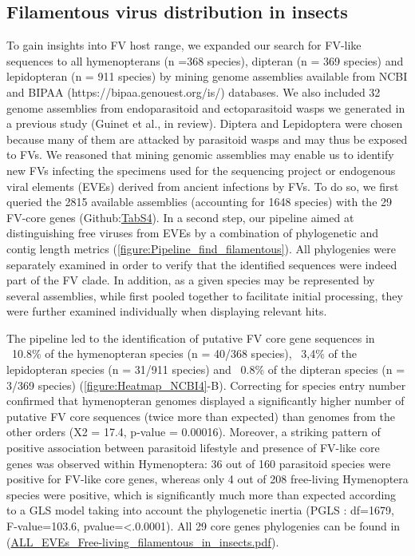\subsection{Filamentous virus distribution in insects}

To gain insights into FV host range, we expanded our search for FV-like sequences to all hymenopterans (n =368 species), dipteran (n = 369 species) and lepidopteran (n = 911 species) by mining genome assemblies available from NCBI and BIPAA (https://bipaa.genouest.org/is/) databases. We also included 32 genome assemblies from endoparasitoid and ectoparasitoid wasps we generated in a previous study (Guinet et al., in review). Diptera and Lepidoptera were chosen because many of them are attacked by parasitoid wasps and may thus be exposed to FVs. We reasoned that mining genomic assemblies may enable us to identify new FVs infecting the specimens used for the sequencing project or endogenous viral elements (EVEs) derived from ancient infections by FVs. To do so, we first queried the 2815 available assemblies (accounting for 1648 species) with the 29 FV-core genes (Github:\href{https://github.com/BenjaminGuinet/PhD_defense/blob/main/Supplementary_paper2/Table%20S4.xlsx}{TabS4}). In a second step, our pipeline aimed at distinguishing free viruses from EVEs by a combination of phylogenetic and contig length metrics (\figurename{\ref{figure:Pipeline_find_filamentous}}). All phylogenies were separately examined in order to verify that the identified sequences were indeed part of the FV clade. In addition, as a given species may be represented by several assemblies, while first pooled together to facilitate initial processing, they were further examined individually when displaying relevant hits. 

The pipeline led to the identification of putative FV core gene sequences in ~10.8\% of the hymenopteran species (n = 40/368 species), ~3,4\% of the lepidopteran species (n = 31/911 species) and ~0.8\% of the dipteran species (n = 3/369 species) (\figurename{\ref{figure:Heatmap_NCBI4}}-B). Correcting for species entry number confirmed that hymenopteran genomes displayed a significantly higher number of putative FV core sequences (twice more than expected) than genomes from the other orders (X2 = 17.4, p-value = 0.00016). Moreover, a striking pattern of positive association between parasitoid lifestyle and presence of FV-like core genes was observed within Hymenoptera: 36 out of 160 parasitoid species were positive for FV-like core genes, whereas only 4 out of 208 free-living Hymenoptera species were positive, which is significantly much more than expected according to a GLS model taking into account the phylogenetic inertia (PGLS : df=1679,  F-value=103.6, pvalue=<.0.0001). All 29 core genes phylogenies can be found in (\href{https://github.com/BenjaminGuinet/PhD_defense/blob/main/Supplementary_paper2/ALL_EVEs_Free-living_filamentous_in_insects.pdf}{ALL\_EVEs\_Free-living\_filamentous\_in\_insects.pdf}).

